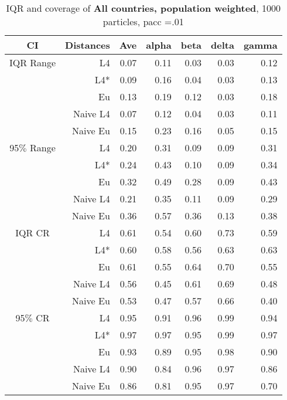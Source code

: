\documentclass[a4paper,12pt,twoside]{book}
\begin{document}
\begin{table}[H]
\centering
\caption{IQR and coverage of \textbf{All countries, population weighted}, 1000 particles, pacc =.01}

\begin{tabular}{crrrrrr}
  \hline
{\color{blue}CI} & Distances & Ave & alpha & beta & delta & gamma \\ 
  \hline
{\color{blue}IQR Range} & L4  &0.07 & 0.11 & 0.03 & 0.03 & 0.12 \\ 
  
&L4*  &0.09 & 0.16 & 0.04 & 0.03 & 0.13 \\ 
  
&Eu &     0.13 & 0.19 & 0.12 & 0.03 & 0.18 \\ 
  
&Naive L4& 0.07 & 0.12 & 0.04 & 0.03 & 0.11 \\
&Naive Eu &  0.15 & 0.23 & 0.16 & 0.05 & 0.15 \\ 
   
    {\color{blue}95$\%$ Range} & L4  &0.20 & 0.31 & 0.09 & 0.09 & 0.31 \\ 
 
    &L4*  &  0.24 & 0.43 & 0.10 & 0.09 & 0.34 \\ 
  
&Eu &   0.32 & 0.49 & 0.28 & 0.09 & 0.43 \\ 
  
&Naive L4&   0.21 & 0.35 & 0.11 & 0.09 & 0.29 \\  
 
&Naive Eu &   0.36 & 0.57 & 0.36 & 0.13 & 0.38 \\ 
  
   \hline
   
{\color{blue} IQR CR } & L4  &0.61 & 0.54 & 0.60 & 0.73 & 0.59 \\ 
   

&L4*  &  0.60 & 0.58 & 0.56 & 0.63 & 0.63 \\ 
 
 
&Eu &     0.61 & 0.55 & 0.64 & 0.70 & 0.55 \\ 
  
&Naive L4& 0.56 & 0.45 & 0.61 & 0.69 & 0.48 \\
&Naive Eu &  0.53 & 0.47 & 0.57 & 0.66 & 0.40 \\ 
  

 {\color{blue} 95$\%$ CR }& L4  &0.95 & 0.91 & 0.96 & 0.99 & 0.94 \\ 
  
 
  &L4*  &    0.97 & 0.97 & 0.95 & 0.99 & 0.97 \\ 
 
&Eu &   0.93 & 0.89 & 0.95 & 0.98 & 0.90 \\ 
 
&Naive L4&   0.90 & 0.84 & 0.96 & 0.97 & 0.86 \\
 
&Naive Eu &     0.86 & 0.81 & 0.95 & 0.97 & 0.70 \\ 
  
\end{tabular}

\end{table}
\end{document}
